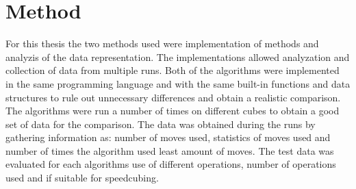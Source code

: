 \documentclass[a4paper,11pt]{kth-mag}
\begin{document}
\chapter{Method}
For this thesis the two methods used were implementation of methods and analyzis of the data representation. The implementations allowed analyzation and collection of data from multiple runs.
Both of the algorithms were implemented in the same programming language and with the same built-in functions and data structures to rule out unnecessary differences and obtain a realistic comparison.
The algorithms were run a number of times on different cubes to obtain a good set of data for the comparison. The data was obtained during the runs by gathering information as: number of moves used, statistics of moves used and number of times the algorithm used least amount of moves.  
The test data was evaluated for each algorithms use of different operations, number of operations used and if suitable for speedcubing.
\end{document}
